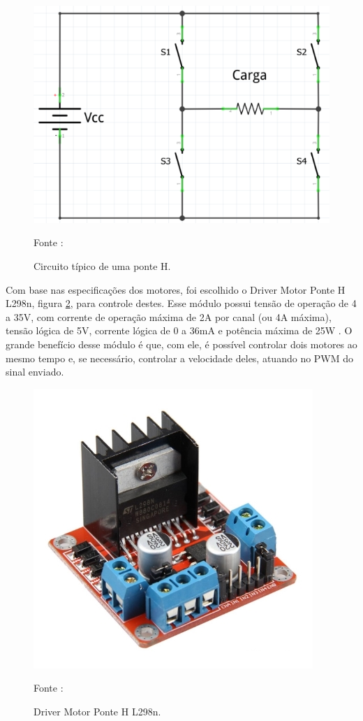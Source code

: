 \begin{figure}[H]
  \centering
  \includegraphics[scale=0.3]{figuras/ponteH_circuito.png}
  \caption{ Circuito típico de uma ponte H.} 
  {\footnotesize Fonte : \cite{PonteH_Teoria}} 
  \label{fig:PonteH_circuito}
\end{figure}

\par Com base nas especificações dos motores, foi escolhido o Driver Motor Ponte H L298n, figura \ref{fig:PonteH_modulo}, para controle destes. Esse módulo possui tensão de operação de 4 a 35V, com corrente de operação máxima de 2A por canal (ou 4A máxima), tensão lógica de 5V, corrente lógica de 0 a 36mA e potência máxima de 25W \cite{PonteH_Datasheet}. O grande benefício desse módulo é que, com ele, é possível controlar dois motores ao mesmo tempo e, se necessário, controlar a velocidade deles, atuando no PWM do sinal enviado.

\begin{figure}[H]
  \centering
  \includegraphics[scale=0.4]{figuras/ponteH_modulo.jpg}
  \caption{ Driver Motor Ponte H L298n.} 
  {\footnotesize Fonte : \cite{PonteH_mod}} 
  \label{fig:PonteH_modulo}
\end{figure}

